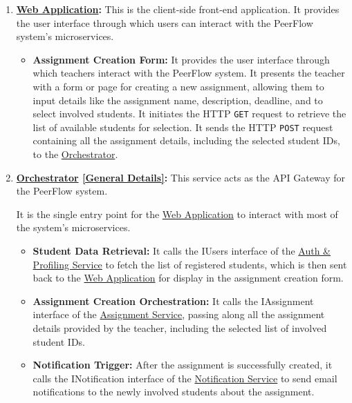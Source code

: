 \begin{enumerate}
    \item \textbf{\hyperref[def:WebApplication]{Web Application}:} This is the client-side front-end application. It provides the user interface through which users can interact with the PeerFlow system’s microservices. 
    \begin{itemize}
        \item \textbf{Assignment Creation Form:}  It provides the user interface through which teachers interact with the PeerFlow system. It presents the teacher with a form or page for creating a new assignment, allowing them to input details like the assignment name, description, deadline, and to select involved students. It initiates the HTTP \texttt{GET} request to retrieve the list of available students for selection. It sends the HTTP \texttt{POST} request containing all the assignment details, including the selected student IDs, to the \hyperref[def:Orchestrator]{Orchestrator}. 
    \end{itemize}

    \item \textbf{\hyperref[def:Orchestrator]{Orchestrator} \hyperref[def:GenDetailsOrchestrator]{[General Details]}:} This service acts as the API Gateway for the PeerFlow system.
    
    It is the single entry point for the \hyperref[def:WebApplication]{Web Application} to interact with most of the system's microservices.
    \begin{itemize}
       
        \item \textbf{Student Data Retrieval:} It calls the IUsers interface of the \hyperref[def:AuthProfilingService]{Auth \& Profiling Service} to fetch the list of registered students, which is then sent back to the \hyperref[def:WebApplication]{Web Application} for display in the assignment creation form.
        
        \item \textbf{Assignment Creation Orchestration:} It calls the IAssignment interface of the \hyperref[def:AssignmentService]{Assignment Service}, passing along all the assignment details provided by the teacher, including the selected list of involved student IDs.
        
        \item \textbf{Notification Trigger:} After the assignment is successfully created, it calls the INotification interface of the \hyperref[def:NotificationService]{Notification Service} to send email notifications to the newly involved students about the assignment.
    \end{itemize}
    

\end{enumerate}
